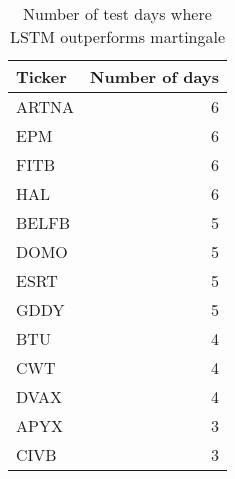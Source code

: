 \begin{table}[H]
\centering
\caption{Number of test days where LSTM outperforms martingale}
\label{tab:num_days_outperform}
\begin{tabular}{lr}
\toprule
Ticker & Number of days \\
\midrule
ARTNA & 6 \\
EPM & 6 \\
FITB & 6 \\
HAL & 6 \\
BELFB & 5 \\
DOMO & 5 \\
ESRT & 5 \\
GDDY & 5 \\
BTU & 4 \\
CWT & 4 \\
DVAX & 4 \\
APYX & 3 \\
CIVB & 3 \\
\bottomrule
\end{tabular}
\end{table}
